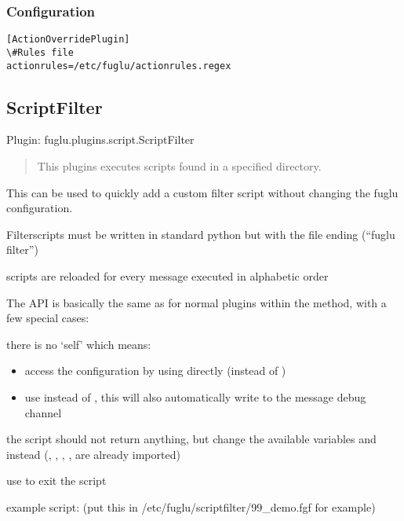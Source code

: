 \documentclass[letterpaper,10pt,english]{sphinxmanual}
\begin{document}
\subsubsection{Configuration}
\label{plugins-index:id9}
\begin{Verbatim}[commandchars=\\\{\}]
[ActionOverridePlugin]
\#Rules file
actionrules=/etc/fuglu/actionrules.regex
\end{Verbatim}


\subsection{ScriptFilter}
\label{plugins-index:scriptfilter}
Plugin: fuglu.plugins.script.ScriptFilter
\begin{quote}

This plugins executes scripts found in a specified directory.
\end{quote}

This can be used to quickly add a custom filter script without changing the fuglu configuration.

Filterscripts must be written in standard python but with the file ending  (``fuglu filter'')

scripts are reloaded for every message executed in alphabetic order

The API is basically the same as for normal plugins within the  method, with a few special cases:

there is no `self' which means:
\begin{itemize}
\item {} 
access the configuration by using  directly (instead of )

\item {} 
use  instead of , this will also automatically write to the message debug channel

\end{itemize}

the script should not return anything, but change the available variables  and  instead
(, , , ,  are already imported)

use  to exit the script

example script:
(put this in /etc/fuglu/scriptfilter/99\_demo.fgf for example)
\end{document}
